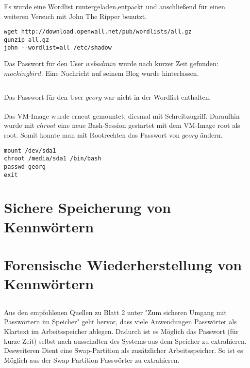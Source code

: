 \documentclass[12pt]{article}
\theoremstyle{plain}
\begin{document}
\subsubsection{}
Es wurde eine Wordlist runtergeladen,entpackt und anschließend für einen weiteren Versuch mit John The Ripper benutzt.
\begin{lstlisting}
wget http://download.openwall.net/pub/wordlists/all.gz
gunzip all.gz
john --wordlist=all /etc/shadow
\end{lstlisting}
Das Passwort für den User $webadmin$ wurde nach kurzer Zeit gefunden: $mockingbird$. Eine Nachricht auf seinem Blog wurde hinterlassen.
\subsection{}
Das Passwort für den User $georg$ war nicht in der Wordlist enthalten. \\ \\
Das VM-Image wurde erneut gemountet, diesmal mit Schreibzugriff. Daraufhin wurde mit $chroot$ eine neue Bash-Session gestartet mit dem VM-Image root als root. Somit konnte man mit Rootrechten das Passwort von $georg$ ändern.
\begin{lstlisting}
mount /dev/sda1
chroot /media/sda1 /bin/bash
passwd georg
exit
\end{lstlisting}
\section{Sichere Speicherung von Kennwörtern}
\subsection{}
\subsection{}
\subsection{}
\section{Forensische Wiederherstellung von Kennwörtern}
\subsection{}
Aus den empfohlenen Quellen zu Blatt 2 unter "Zum sicheren Umgang mit Passwörtern im Speicher" geht hervor, dass viele Anwendungen Passwörter als Klartext im Arbeitsspeicher ablegen. Dadurch ist es Möglich das Passwort (für kurze Zeit) selbst nach ausschalten des Systems aus dem Speicher zu extrahieren. Desweiteren Dient eine Swap-Partition als zusätzlicher Arbeitsspeicher. So ist es Möglich aus der Swap-Partition Passwörter zu extrahieren.
\end{document}
